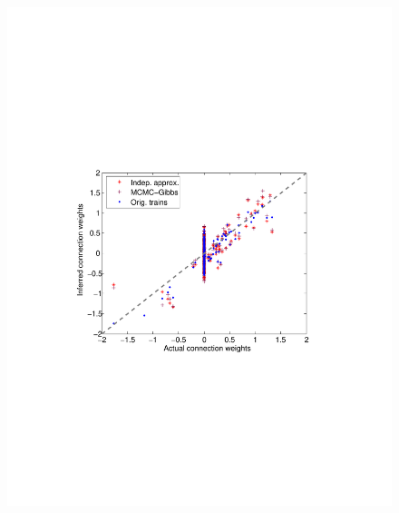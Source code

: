 \begin{figure}[h]
\begin{minipage}[c]{0.45\hsize}
\includegraphics[width=\hsize]{../figs/FigureA3_scatter_three_corrected}
\end{minipage}
\begin{minipage}[c]{0.3\hsize}

\end{minipage}
\end{figure}
